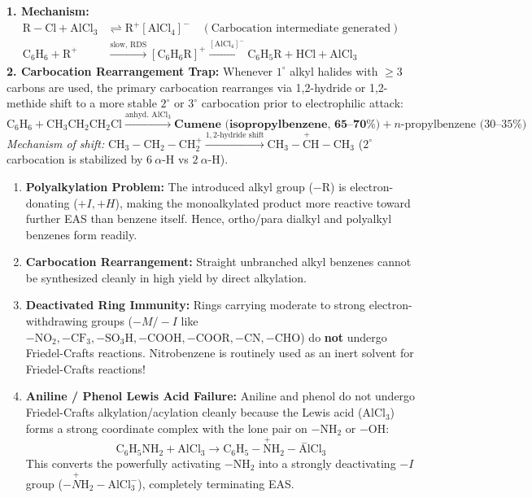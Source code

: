 \documentclass[10pt,a4paper]{article}
\begin{document}
\begin{conceptbox}
\textbf{1. Mechanism:}
\begin{align}
  \mathrm{R-Cl} + \mathrm{AlCl_3} &\rightleftharpoons \mathrm{R}^+[\mathrm{AlCl_4}]^- \quad (\text{Carbocation intermediate generated})\\
  \mathrm{C_6H_6} + \mathrm{R}^+ &\xrightarrow{\text{slow, RDS}} [\mathrm{C_6H_6R}]^+ \xrightarrow{[\mathrm{AlCl_4}]^-} \mathrm{C_6H_5R} + \mathrm{HCl} + \mathrm{AlCl_3}
\end{align}
\textbf{2. Carbocation Rearrangement Trap:} Whenever $1^\circ$ alkyl halides with $\ge 3$ carbons are used, the primary carbocation rearranges via 1,2-hydride or 1,2-methide shift to a more stable $2^\circ$ or $3^\circ$ carbocation prior to electrophilic attack:
\begin{equation}
  \mathrm{C_6H_6} + \mathrm{CH_3CH_2CH_2Cl} \xrightarrow{\text{anhyd. } \mathrm{AlCl_3}} \textbf{Cumene (isopropylbenzene, 65--70\%)} + n\text{-propylbenzene (30--35\%)}
\end{equation}
\textit{Mechanism of shift:} $\mathrm{CH_3-CH_2-CH_2^+} \xrightarrow{1,2\text{-hydride shift}} \mathrm{CH_3-\overset{+}{C}H-CH_3}$ ($2^\circ$ carbocation is stabilized by $6\ \alpha$-H vs $2\ \alpha$-H).
\end{conceptbox}

\begin{trapbox}
\begin{enumerate}[leftmargin=*]
  \item \textbf{Polyalkylation Problem:} The introduced alkyl group ($-\mathrm{R}$) is electron-donating ($+I, +H$), making the monoalkylated product more reactive toward further EAS than benzene itself. Hence, ortho/para dialkyl and polyalkyl benzenes form readily.
  \item \textbf{Carbocation Rearrangement:} Straight unbranched alkyl benzenes cannot be synthesized cleanly in high yield by direct alkylation.
  \item \textbf{Deactivated Ring Immunity:} Rings carrying moderate to strong electron-withdrawing groups ($-M / -I$ like $-\mathrm{NO_2, -CF_3, -SO_3H, -COOH, -COOR, -CN, -CHO}$) do \textbf{not} undergo Friedel-Crafts reactions. Nitrobenzene is routinely used as an inert solvent for Friedel-Crafts reactions!
  \item \textbf{Aniline / Phenol Lewis Acid Failure:} Aniline and phenol do not undergo Friedel-Crafts alkylation/acylation cleanly because the Lewis acid ($\mathrm{AlCl_3}$) forms a strong coordinate complex with the lone pair on $-\mathrm{NH_2}$ or $-\mathrm{OH}$:
  \begin{equation}
    \mathrm{C_6H_5NH_2} + \mathrm{AlCl_3} \to \mathrm{C_6H_5-\overset{+}{N}H_2-\overset{-}{Al}Cl_3}
  \end{equation}
  This converts the powerfully activating $-\mathrm{NH_2}$ into a strongly deactivating $-I$ group ($-\overset{+}{N}\mathrm{H_2-AlCl_3^-}$), completely terminating EAS.
\end{enumerate}
\end{trapbox}
\end{document}
